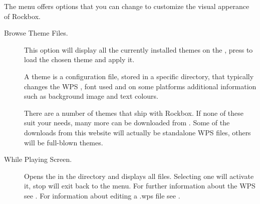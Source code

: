 The  menu offers options that you can change to
customize the visual apperance of Rockbox.

\begin{description}
\item[Browse Theme Files.]
  This option will display all the currently installed themes on the \dap{}, 
  press \ActionTreeEnter{} to load the chosen theme and apply it.

  A theme is a configuration file, stored in a specific directory, 
  that typically changes the WPS 
  , font used and on some platforms
  additional information such as background image and text colours.

  There are a number of themes that ship with Rockbox. If none of
  these suit your needs, many more can be downloaded from 
  .
  Some of the downloads from this website will actually be standalone WPS files, 
  others will be full-blown themes. 



\item[While Playing Screen.]
  Opens the  in the  directory and
  displays all  files. Selecting one will activate it, stop will
  exit back to the menu. For further information about the WPS see 
  . For information about editing a .wps file see
  .



\end{description}
